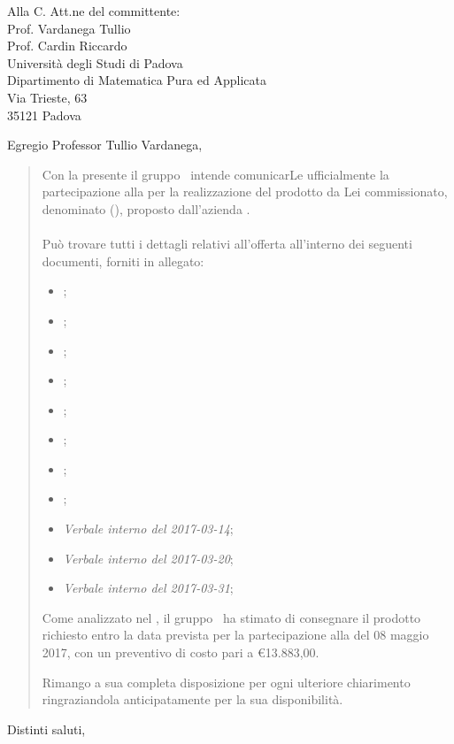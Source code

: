 \documentclass{letter}
\date{Padova, 11 Aprile 2017}
\begin{document}
\begin{letter}{
	Alla C. Att.ne del committente: \\
	Prof. Vardanega Tullio \\
	Prof. Cardin Riccardo \\
	Università degli Studi di Padova \\
	Dipartimento di Matematica Pura ed Applicata \\
	Via Trieste, 63 \\
	35121 Padova
}


\opening{Egregio Professor Tullio Vardanega,}

\begin{quotation}

	Con la presente il gruppo \kpanic\ intende comunicarLe ufficialmente la partecipazione alla \textbf{\revisionediqualifica} per la realizzazione del prodotto da Lei commissionato, denominato \textbf{\atavi} (\textbf{\acratavi}), proposto dall'azienda \textbf{\prop}.\\\\
	Può trovare tutti i dettagli relativi all'offerta all'interno dei seguenti documenti, forniti in allegato:\vspace{0.5em}

	\begin{itemize}
		\item \analisideirequisitiRQ;
		\item {};
		\item \glossarioRQ;
		\item \manualesviluppatorev;
		\item \manualeutentev;
		\item \normediprogettoRQ;
		\item \pianodiprogettoRQ;
		\item \pianodiqualificaRQ;
		\item \emph{Verbale interno del 2017-03-14};
		\item \emph{Verbale interno del 2017-03-20};
		\item \emph{Verbale interno del 2017-03-31};
		\vspace{0.5em}
	\end{itemize}
	
	Come analizzato nel \pianodiprogettov, il gruppo \kpanic\ ha stimato di consegnare il prodotto richiesto entro la data prevista per la partecipazione alla \textbf{\revisionediaccettazione} del 08 maggio 2017, con un preventivo di costo pari a \euro 13.883,00.

	Rimango a sua completa disposizione per ogni ulteriore chiarimento ringraziandola anticipatamente per la sua disponibilità.

\end{quotation}

\closing{Distinti saluti,}

\end{letter}
\end{document}
